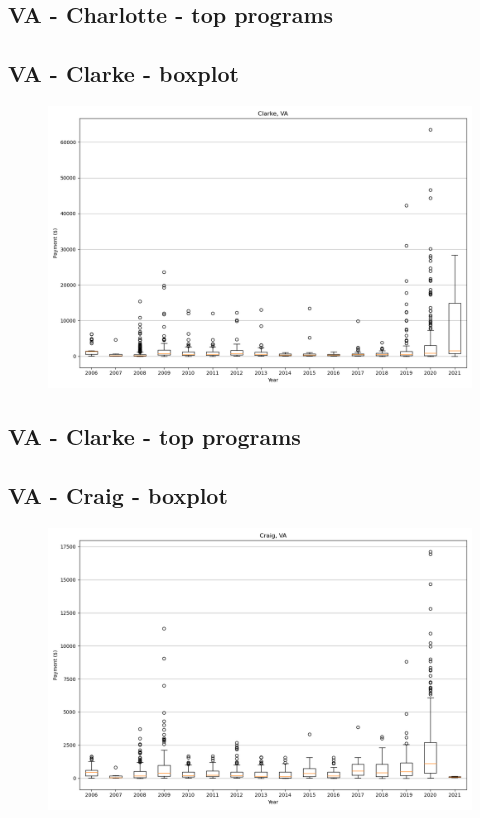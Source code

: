 \subsection*{VA - Charlotte - top programs}

\newpage
\subsection*{VA - Clarke - boxplot}
\begin{figure}[h]
\centering
\includegraphics[width=7in]{../output/boxplots/counties/Clarke-VA_boxplot.png}
\end{figure}


\subsection*{VA - Clarke - top programs}

\newpage
\subsection*{VA - Craig - boxplot}
\begin{figure}[h]
\centering
\includegraphics[width=7in]{../output/boxplots/counties/Craig-VA_boxplot.png}
\end{figure}


